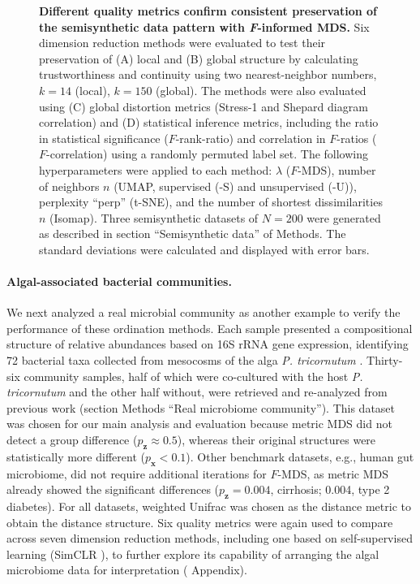 \documentclass[10pt,letterpaper]{article}
\newcommand{\1}{{\rm 1}\kern-0.24em{\rm I}}
\begin{document}
\begin{figure}[h!]
    \centering
    \caption{\textbf{Different quality metrics confirm consistent preservation of the semisynthetic data pattern with \textit{F}-informed MDS.} Six dimension reduction methods were evaluated to test their preservation of (A) local and (B) global structure by calculating trustworthiness and continuity using two nearest-neighbor numbers, $k=14$ (local), $k=150$ (global). The methods were also evaluated using (C) global distortion metrics (Stress-1 and Shepard diagram correlation) and (D) statistical inference metrics, including the ratio in statistical significance ($F$-rank-ratio) and correlation in $F$-ratios ($F$-correlation) using a randomly permuted label set. The following hyperparameters were applied to each method: $\lambda$ ($F$-MDS), number of neighbors $n$ (UMAP, supervised (-S) and unsupervised (-U)), perplexity ``perp'' (t-SNE), and the number of shortest dissimilarities $n$ (Isomap). Three semisynthetic datasets of $N=200$ were generated as described in section ``Semisynthetic data'' of Methods. The standard deviations were calculated and displayed with error bars.}
    \label{fig:eval_simul}
\end{figure}


\paragraph*{Algal-associated bacterial communities.}
We next analyzed a real microbial community as another example to verify the performance of these ordination methods. Each sample presented a compositional structure of relative abundances based on 16S rRNA gene expression, identifying 72 bacterial taxa collected from mesocosms of the alga \textit{P. tricornutum} \cite{Samo18, Kimbrel19}. Thirty-six community samples, half of which were co-cultured with the host \textit{P. tricornutum} and the other half without, were retrieved and re-analyzed from previous work \cite{kim22} (section Methods ``Real microbiome community''). This dataset was chosen for our main analysis and evaluation because metric MDS did not detect a group difference ($p_\mathbf{z}\approx0.5$), whereas their original structures were statistically more different ($p_\mathbf{x}<0.1$). Other benchmark datasets, e.g., human gut microbiome, did not require additional iterations for $F$-MDS, as metric MDS already showed the significant differences ($p_\mathbf{z}= 0.004$, cirrhosis; 0.004, type 2 diabetes). For all datasets, weighted Unifrac \cite{lozupone07} was chosen as the distance metric to obtain the distance structure. Six quality metrics were again used to compare across seven dimension reduction methods, including one based on self-supervised learning (SimCLR \cite{chen20}), to further explore its capability of arranging the algal microbiome data for interpretation ( Appendix). 
\end{document}
